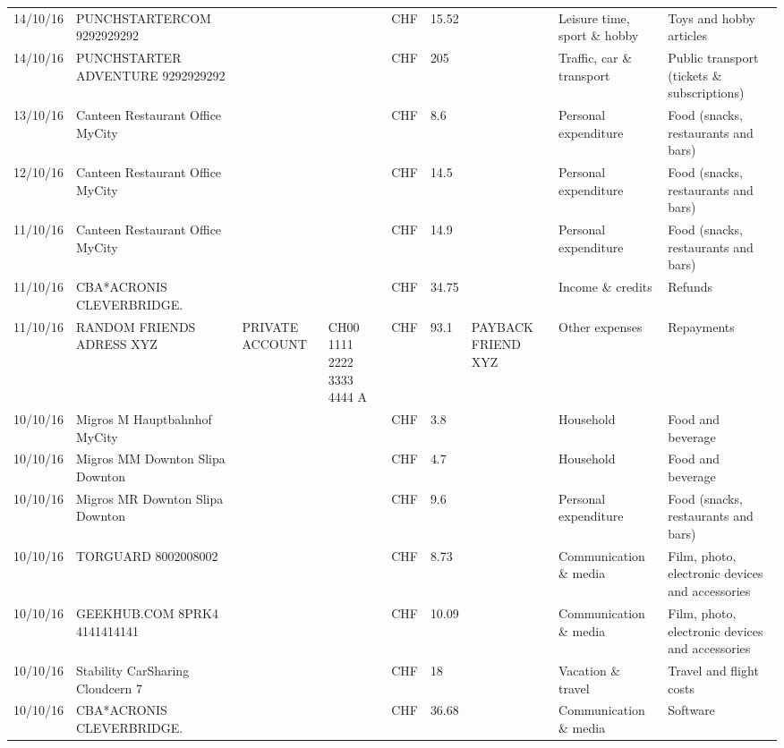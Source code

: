 \begin{landscape}
\begin{center}
\begin{longtable}{lllllllll}
		14/10/16 & PUNCHSTARTERCOM           9292929292 &       &       & CHF   & 15.52 &       & Leisure time, sport \& hobby & Toys and hobby articles \\
		14/10/16 & PUNCHSTARTER ADVENTURE    9292929292 &       &       & CHF   & 205   &       & Traffic, car \& transport & Public transport (tickets \& subscriptions) \\
		13/10/16 & Canteen Restaurant Office      MyCity &       &       & CHF   & 8.6   &       & Personal expenditure & Food (snacks, restaurants and bars) \\
		12/10/16 & Canteen Restaurant Office      MyCity &       &       & CHF   & 14.5  &       & Personal expenditure & Food (snacks, restaurants and bars) \\
		11/10/16 & Canteen Restaurant Office      MyCity &       &       & CHF   & 14.9  &       & Personal expenditure & Food (snacks, restaurants and bars) \\
		11/10/16 & CBA*ACRONIS              CLEVERBRIDGE. &       &       & CHF   & 34.75 &       & Income \& credits & Refunds \\
		11/10/16 & RANDOM FRIENDS ADRESS XYZ & PRIVATE ACCOUNT & CH00 1111 2222 3333 4444 A & CHF   & 93.1  & PAYBACK FRIEND XYZ & Other expenses & Repayments \\
		10/10/16 & Migros M Hauptbahnhof    MyCity &       &       & CHF   & 3.8   &       & Household & Food and beverage \\
		10/10/16 & Migros MM Downton Slipa   Downton &       &       & CHF   & 4.7   &       & Household & Food and beverage \\
		10/10/16 & Migros MR Downton Slipa   Downton &       &       & CHF   & 9.6   &       & Personal expenditure & Food (snacks, restaurants and bars) \\
		10/10/16 & TORGUARD                 8002008002 &       &       & CHF   & 8.73  &       & Communication \& media & Film, photo, electronic devices and accessories \\
		10/10/16 & GEEKHUB.COM  8PRK4        4141414141 &       &       & CHF   & 10.09 &       & Communication \& media & Film, photo, electronic devices and accessories \\
		10/10/16 & Stability CarSharing      Cloudcern 7 &       &       & CHF   & 18    &       & Vacation \& travel & Travel and flight costs \\
		10/10/16 & CBA*ACRONIS              CLEVERBRIDGE. &       &       & CHF   & 36.68 &       & Communication \& media & Software \\

\end{longtable}
\end{center}
\end{landscape}
